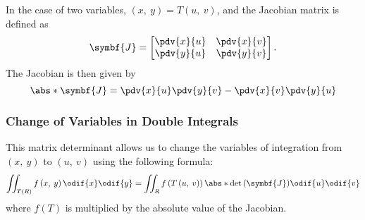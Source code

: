 \documentclass{article}
\begin{document}
In the case of two variables, \(\left( x,\: y \right) = T\left( u,\: v \right)\),
and the Jacobian matrix is defined as
\begin{equation*}
    \symbf{J} =
    \begin{bmatrix}
        \displaystyle\pdv{x}{u} & \displaystyle\pdv{x}{v} \\
        \displaystyle\pdv{y}{u} & \displaystyle\pdv{y}{v} \\
    \end{bmatrix}
    .
\end{equation*}
The Jacobian is then given by
\begin{equation*}
    \abs*{\symbf{J}} = \pdv{x}{u} \pdv{y}{v} - \pdv{x}{v} \pdv{y}{u}
\end{equation*}
\subsubsection{Change of Variables in Double Integrals}
This matrix determinant allows us to change the variables of
integration from \(\left( x,\: y \right)\) to \(\left( u,\: v \right)\)
using the following formula:
\begin{equation*}
    \iint_{T\left( R \right)} f\left( x,\: y \right) \odif{x}\odif{y} = \iint_R f\left( T\left( u,\: v \right) \right) \abs*{\det{\left( \symbf{J} \right)}} \odif{u}\odif{v}
\end{equation*}
where \(f\left( T \right)\) is multiplied by the absolute value of the
Jacobian.
\end{document}
